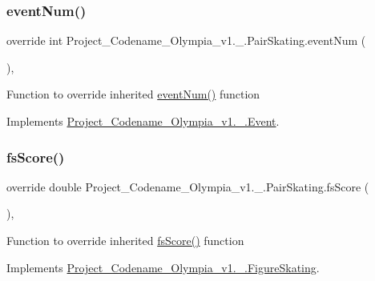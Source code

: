 \subsubsection{\texorpdfstring{event\+Num()}{eventNum()}}
{\footnotesize\ttfamily override int Project\+\_\+\+Codename\+\_\+\+Olympia\+\_\+v1.\+\_.\+Pair\+Skating.\+event\+Num (\begin{DoxyParamCaption}{ }\end{DoxyParamCaption})\hspace{0.3cm}{\ttfamily [inline]}, {\ttfamily [virtual]}}

Function to override inherited \hyperlink{classProject__Codename__Olympia__v1_1_1__0_1_1PairSkating_a22c797f9392cc5e53c9cbacb641e56e0}{event\+Num()} function 

Implements \hyperlink{classProject__Codename__Olympia__v1_1_1__0_1_1Event_ad1154ef4dd1dec29d8ebf5614d84b1f3}{Project\+\_\+\+Codename\+\_\+\+Olympia\+\_\+v1.\+\_.\+Event}.

\mbox{\label{classProject__Codename__Olympia__v1_1_1__0_1_1PairSkating_aef6f7313446386c4e6bdf8a438e246a1}} 
\subsubsection{\texorpdfstring{fs\+Score()}{fsScore()}}
{\footnotesize\ttfamily override double Project\+\_\+\+Codename\+\_\+\+Olympia\+\_\+v1.\+\_.\+Pair\+Skating.\+fs\+Score (\begin{DoxyParamCaption}{ }\end{DoxyParamCaption})\hspace{0.3cm}{\ttfamily [inline]}, {\ttfamily [virtual]}}

Function to override inherited \hyperlink{classProject__Codename__Olympia__v1_1_1__0_1_1PairSkating_aef6f7313446386c4e6bdf8a438e246a1}{fs\+Score()} function 

Implements \hyperlink{classProject__Codename__Olympia__v1_1_1__0_1_1FigureSkating_a437e794fec382863421f8c65e31295f8}{Project\+\_\+\+Codename\+\_\+\+Olympia\+\_\+v1.\+\_.\+Figure\+Skating}.

